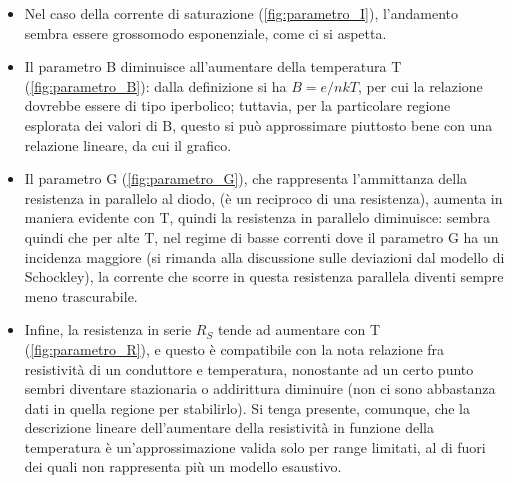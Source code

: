 \documentclass[10pt,letterpaper]{article}
\begin{document}
\begin{itemize}
\item Nel caso della corrente di saturazione (\ref{fig:parametro_I}), l'andamento sembra essere grossomodo esponenziale, come ci si aspetta. \\
\item Il parametro B diminuisce all'aumentare della temperatura T (\ref{fig:parametro_B}): dalla definizione si ha $B = e/nkT$, per cui la relazione dovrebbe essere di tipo iperbolico; tuttavia, per la particolare regione esplorata dei valori di B, questo si può approssimare piuttosto bene con una relazione lineare, da cui il grafico.\\
\item Il parametro G (\ref{fig:parametro_G}), che rappresenta l'ammittanza della resistenza in parallelo al diodo, (è un reciproco di una resistenza), aumenta in maniera evidente con T, quindi la resistenza in parallelo diminuisce: sembra quindi che per alte T, nel regime di basse correnti dove il parametro G ha un incidenza maggiore (si rimanda alla discussione sulle deviazioni dal modello di Schockley), la corrente che scorre in questa resistenza parallela diventi sempre meno trascurabile.\\
\item Infine, la resistenza in serie $R_S$ tende ad aumentare con T (\ref{fig:parametro_R}), e questo è compatibile con la nota relazione fra resistività di un conduttore e temperatura, nonostante ad un certo punto sembri diventare stazionaria o addirittura diminuire (non ci sono abbastanza dati in quella regione per stabilirlo). Si tenga presente, comunque, che la descrizione lineare dell'aumentare della resistività in funzione della temperatura è un'approssimazione valida solo per range limitati, al di fuori dei quali non rappresenta più un modello esaustivo.
\end{itemize}
\end{document}
